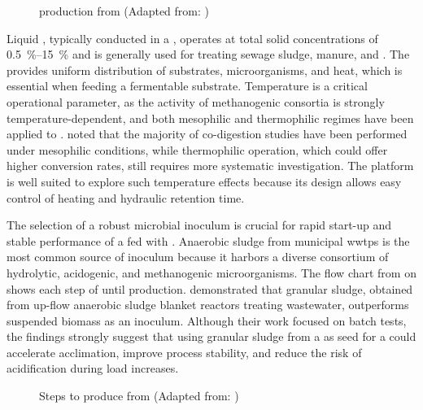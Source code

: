 \documentclass[12pt, a4paper, oneside]{report}
\begin{document}
\begin{figure}[H]
    \centering
    \resizebox{0.65\textwidth}{!}{
    }
    \caption{ production from  (Adapted from: \textcite{li2011})}
    \label{graph:ch4-prod}
\end{figure}

Liquid , typically conducted in a , operates at total solid concentrations of \qtyrange{0.5}{15}{\percent} and is generally used for treating sewage sludge, manure, and  \parencite{li2011}. The  provides uniform distribution of substrates, microorganisms, and heat, which is essential when feeding a fermentable substrate. Temperature is a critical operational parameter, as the activity of methanogenic consortia is strongly temperature-dependent, and both mesophilic and thermophilic regimes have been applied to  \parencite{choorit2007}. \textcite{tomczak2025} noted that the majority of  co-digestion studies have been performed under mesophilic conditions, while thermophilic operation, which could offer higher conversion rates, still requires more systematic investigation. The  platform is well suited to explore such temperature effects because its design allows easy control of heating and hydraulic retention time.

The selection of a robust microbial inoculum is crucial for rapid start-up and stable performance of a  fed with . Anaerobic sludge from municipal \glspl{wwtp} is the most common source of inoculum because it harbors a diverse consortium of hydrolytic, acidogenic, and methanogenic microorganisms. The flow chart from \textcite{gebreegziabher2025} on  shows each step of  until  production. \textcite{posmanik2020} demonstrated that granular sludge, obtained from up-flow anaerobic sludge blanket reactors treating wastewater, outperforms suspended biomass as an inoculum. Although their work focused on batch tests, the findings strongly suggest that using granular sludge from a  as seed for a  could accelerate acclimation, improve process stability, and reduce the risk of acidification during load increases.

\begin{figure}[H]
    \centering
    \resizebox{0.65\textwidth}{!}{
    }
    \caption{Steps to produce  from  (Adapted from: \textcite{gebreegziabher2025})}
    \label{graph:ch4-steps}
\end{figure}
\end{document}
